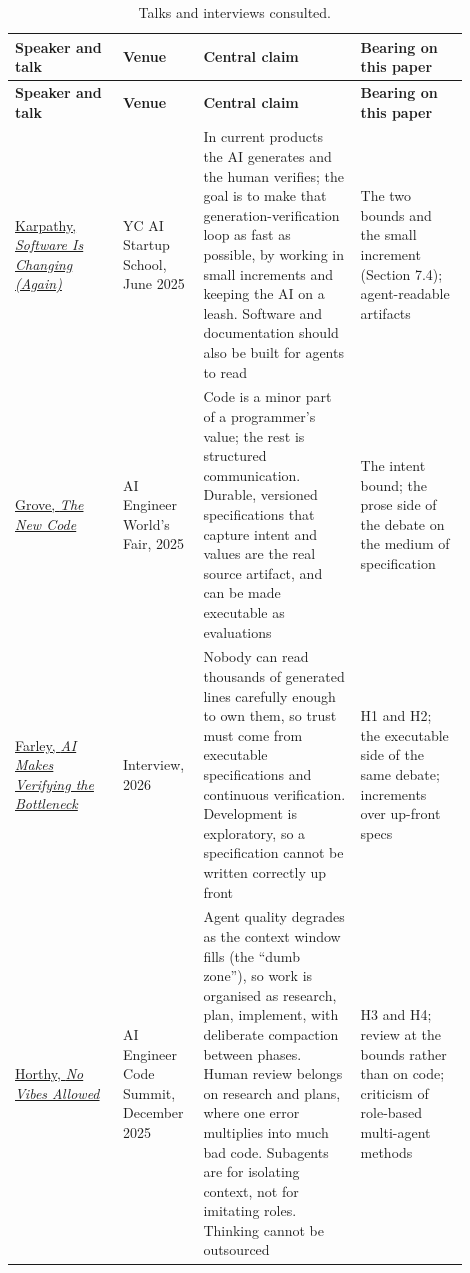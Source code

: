\documentclass[11pt]{article}
\begin{document}
\small
\begin{longtable}{p{0.22\linewidth}p{0.14\linewidth}p{0.32\linewidth}p{0.22\linewidth}}
\caption{Talks and interviews consulted.}\\
\toprule
\textbf{Speaker and talk} & \textbf{Venue} & \textbf{Central claim} & \textbf{Bearing on this paper} \\
\midrule
\endfirsthead
\toprule
\textbf{Speaker and talk} & \textbf{Venue} & \textbf{Central claim} & \textbf{Bearing on this paper} \\
\midrule
\endhead
\href{https://singjupost.com/andrej-karpathy-software-is-changing-again/}{Karpathy, \emph{Software Is Changing (Again)}} & YC AI Startup School, June 2025 & In current products the AI generates and the human verifies; the goal is to make that generation-verification loop as fast as possible, by working in small increments and keeping the AI on a leash. Software and documentation should also be built for agents to read & The two bounds and the small increment (Section 7.4); agent-readable artifacts \\
\href{https://ai.engineer/talks/8rABwKRsec4-specifications-are-the-new-code}{Grove, \emph{The New Code}} & AI Engineer World's Fair, 2025 & Code is a minor part of a programmer's value; the rest is structured communication. Durable, versioned specifications that capture intent and values are the real source artifact, and can be made executable as evaluations & The intent bound; the prose side of the debate on the medium of specification \\
\href{https://www.aviator.co/podcast/engineering-discipline-dave-farley}{Farley, \emph{AI Makes Verifying the Bottleneck}} & Interview, 2026 & Nobody can read thousands of generated lines carefully enough to own them, so trust must come from executable specifications and continuous verification. Development is exploratory, so a specification cannot be written correctly up front & H1 and H2; the executable side of the same debate; increments over up-front specs \\
\href{https://www.usetranscribe.io/yt/rmvDxxNubIg/ai-in-software}{Horthy, \emph{No Vibes Allowed}} & AI Engineer Code Summit, December 2025 & Agent quality degrades as the context window fills (the ``dumb zone''), so work is organised as research, plan, implement, with deliberate compaction between phases. Human review belongs on research and plans, where one error multiplies into much bad code. Subagents are for isolating context, not for imitating roles. Thinking cannot be outsourced & H3 and H4; review at the bounds rather than on code; criticism of role-based multi-agent methods \\

\end{longtable}
\end{document}
